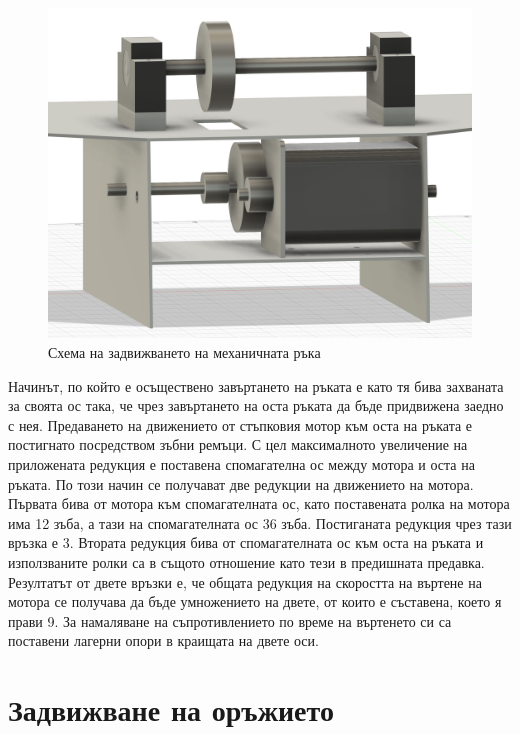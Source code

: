 \begin{figure}[H]
    \centering
    \includegraphics[width=\linewidth]{images/hand-movement.png}
    
    \caption{Схема на задвижването на механичната ръка}
    \label{fig:hand-movement} 
\end{figure}

Начинът, по който е осъществено завъртането на ръката е като тя бива захваната за своята ос така, че чрез завъртането на оста ръката да бъде придвижена заедно с нея. Предаването на движението от стъпковия мотор към оста на ръката е постигнато посредством зъбни ремъци. С цел максималното увеличение на приложената редукция е поставена спомагателна ос между мотора и оста на ръката. По този начин се получават две редукции на движението на мотора. Първата бива от мотора към спомагателната ос, като поставената ролка на мотора има 12 зъба, а тази на спомагателната ос 36 зъба. Постиганата редукция чрез тази връзка е 3. Втората редукция бива от спомагателната ос към оста на ръката и използваните ролки са в същото отношение като тези в предишната предавка. Резултатът от двете връзки е, че общата редукция на скоростта на въртене на мотора се получава да бъде умножението на двете, от които е съставена, което я прави 9. За намаляване на съпротивлението по време на въртенето си са поставени лагерни опори в краищата на двете оси.



\section{Задвижване на оръжието}

